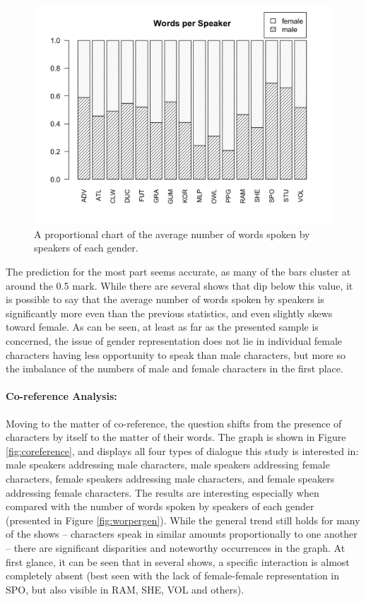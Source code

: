 \documentclass[a4paper, 11pt]{article}
\begin{document}
\begin{figure}[t!]
  \includegraphics[width=\linewidth]{figures/worperspk.png}
  \caption{A proportional chart of the average number of words spoken by speakers of each gender.}
  \label{fig:worperspk}
\end{figure}

The prediction for the most part seems accurate, as many of the bars cluster at around the 0.5 mark. While there are several shows that dip below this value, it is possible to say that the average number of words spoken by speakers is significantly more even than the previous statistics, and even slightly skews toward female. As can be seen, at least as far as the presented sample is concerned, the issue of gender representation does not lie in individual female characters having less opportunity to speak than male characters, but more so the imbalance of the numbers of male and female characters in the first place.

\paragraph{Co-reference Analysis:}
Moving to the matter of co-reference, the question shifts from the presence of characters by itself to the matter of their words. The graph is shown in Figure \ref{fig:coreference}, and displays all four types of dialogue this study is interested in: male speakers addressing male characters, male speakers addressing female characters, female speakers addressing male characters, and female speakers addressing female characters. The results are interesting especially when compared with the number of words spoken by speakers of each gender (presented in Figure \ref{fig:worpergen}). While the general trend still holds for many of the shows -- characters speak in similar amounts proportionally to one another -- there are significant disparities and noteworthy occurrences in the graph. At first glance, it can be seen that in several shows, a specific interaction is almost completely absent (best seen with the lack of female-female representation in SPO, but also visible in RAM, SHE, VOL and others).
\end{document}
